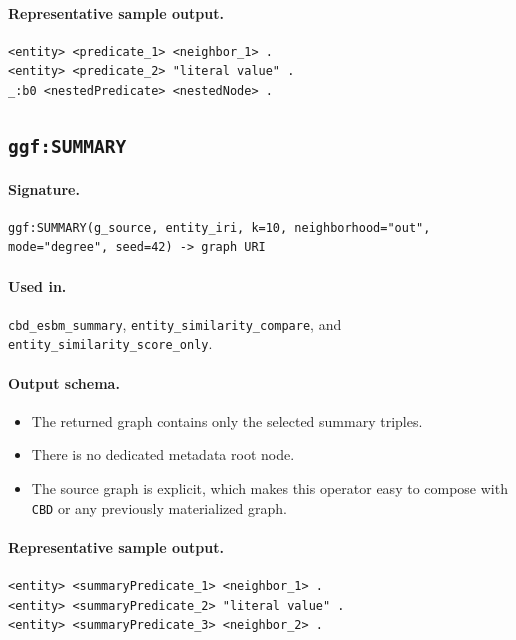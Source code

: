 \paragraph{Representative sample output.}
\begin{verbatim}
<entity> <predicate_1> <neighbor_1> .
<entity> <predicate_2> "literal value" .
_:b0 <nestedPredicate> <nestedNode> .
\end{verbatim}

\subsection{\texttt{ggf:SUMMARY}}
\label{subsec:ggf-summary}

\paragraph{Signature.}
\begin{verbatim}
ggf:SUMMARY(g_source, entity_iri, k=10, neighborhood="out", mode="degree", seed=42) -> graph URI
\end{verbatim}

\paragraph{Used in.}
\texttt{cbd\_esbm\_summary}, \texttt{entity\_similarity\_compare}, and
\texttt{entity\_similarity\_score\_only}.

\paragraph{Output schema.}
\begin{itemize}
\item The returned graph contains only the selected summary triples.
\item There is no dedicated metadata root node.
\item The source graph is explicit, which makes this operator easy to compose
with \texttt{CBD} or any previously materialized graph.
\end{itemize}

\paragraph{Representative sample output.}
\begin{verbatim}
<entity> <summaryPredicate_1> <neighbor_1> .
<entity> <summaryPredicate_2> "literal value" .
<entity> <summaryPredicate_3> <neighbor_2> .
\end{verbatim}

